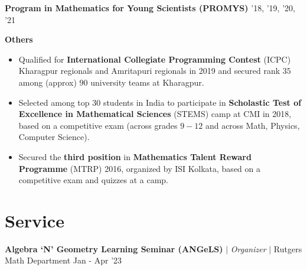 \resumeProjectHeading
{\textbf{Program in Mathematics for Young Scientists (PROMYS)}}
{'18, '19, '20, '21}
{\resumeItemListStart
{}
\resumeItemListEnd}



\vspace{\gap}
\resumeProjectHeading
{\textbf{Others}}
{}
{
\item 
\begin{itemize}[itemsep=-4pt, parsep=5pt, leftmargin=0.5cm]
\item {}  Qualified for \textbf{International Collegiate Programming Contest} (ICPC) Kharagpur regionals and Amritapuri regionals in 2019 and secured rank $35$ among (approx) $90$ university teams at Kharagpur.
        \item Selected among top $30$ students in India to participate in \textbf{Scholastic Test of Excellence in Mathematical Sciences} (STEMS) camp at CMI in 2018, based on a competitive exam (across grades $9-12$ and across Math, Physics, Computer Science).
        \item Secured the \textbf{third position} in \textbf{Mathematics Talent Reward Programme} (MTRP) 2016, organized by ISI Kolkata, based on a competitive exam and quizzes at a camp.
\end{itemize}}
\resumeSubHeadingListEnd









\section{Service}
\resumeSubHeadingListStart



\resumeProjectHeading
{\textbf{Algebra `N' Geometry Learning Seminar (ANGeLS)} $|$ \textit{Organizer} $|$ Rutgers Math Department}
{Jan - Apr '23}
{}
\vspace{\mygap}

